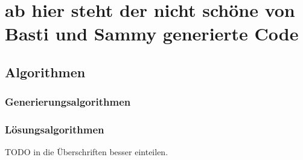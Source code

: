 \documentclass[12pt,a4paper]{article}
\begin{document}


\section{ab hier steht der nicht schöne von Basti und Sammy generierte Code}
\subsection{Algorithmen}
\subsubsection{Generierungsalgorithmen}


\subsubsection{Lösungsalgorithmen}

TODO in die Überschriften besser einteilen.
\end{document}
